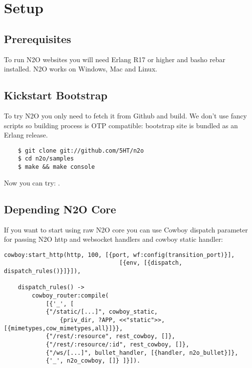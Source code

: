 \section{Setup}

\subsection{Prerequisites}
To run N2O websites you will need Erlang R17 or higher and basho rebar installed.
N2O works on Windows, Mac and Linux.

\subsection{Kickstart Bootstrap}
To try N2O you only need to fetch it from Github and build. We don't use
fancy scripts so building process is OTP compatible: bootstrap site
is bundled as an Erlang release.

\vspace{1\baselineskip}
\begin{lstlisting}
    $ git clone git://github.com/5HT/n2o
    $ cd n2o/samples
    $ make && make console
\end{lstlisting}
\vspace{1\baselineskip}

Now you can try: .

\newpage
\subsection{Depending N2O Core}
If you want to start using raw N2O core you can use Cowboy dispatch parameter
for passing N2O http and websocket handlers and cowboy static handler:

\begin{lstlisting}[caption=web\_sup.erl]
    cowboy:start_http(http, 100, [{port, wf:config(transition_port)}],
                                 [{env, [{dispatch, dispatch_rules()}]}]),

    dispatch_rules() ->
        cowboy_router:compile(
            [{'_', [
            {"/static/[...]", cowboy_static,
                {priv_dir, ?APP, <<"static">>,[{mimetypes,cow_mimetypes,all}]}},
            {"/rest/:resource", rest_cowboy, []},
            {"/rest/:resource/:id", rest_cowboy, []},
            {"/ws/[...]", bullet_handler, [{handler, n2o_bullet}]},
            {'_', n2o_cowboy, []} ]}]).
\end{lstlisting}

